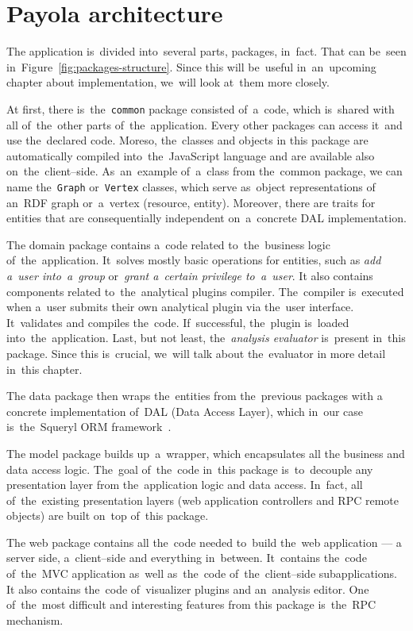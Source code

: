 \section{Payola architecture}
The application is~divided into~several parts, packages, in~fact. That can be~seen in~Figure~\ref{fig:packages-structure}. Since this will be~useful in~an~upcoming
chapter about implementation, we~will look at~them more closely.

At first, there is~the~\texttt{common} package consisted of~a~code, which is~shared with all of~the~other parts of~the~application. Every other packages can 
access it~and use the~declared code. Moreso, the~classes and objects 
in this package are automatically compiled into~the~JavaScript language and are available
also on~the~client--side. As~an~example of~a~class from the~common package, we
can name the~\texttt{Graph} or~\texttt{Vertex} classes, which serve as~object representations
of an~RDF graph or~a~vertex (resource, entity). Moreover, there are traits for 
entities that are consequentially independent on~a~concrete DAL implementation.

The domain package contains a~code related to~the~business logic of~the~application. It~solves mostly basic operations for entities, such as
\emph{add a~user into~a~group} or~\emph{grant a~certain privilege to~a~user}.
It also contains components related to~the~analytical plugins compiler. The~compiler is~executed when a~user submits their own analytical plugin via the~user 
interface. It~validates and compiles the~code. If~successful, the~plugin is~loaded into~the~application. Last, but not least, the~\emph{analysis evaluator} is~present in~this package. Since this is~crucial, we~will talk about the~evaluator
in more detail in~this chapter.

The data package then wraps the~entities from the~previous packages with a
concrete implementation of~DAL (Data Access Layer), which in~our case is~the~Squeryl
ORM framework~\cite{squeryl}.

The model package builds up~a~wrapper, which encapsulates all the
business and data access logic. The~goal of~the~code in~this package is~to~decouple
any presentation layer from the~application logic and data access. In~fact,
all of~the~existing presentation layers (web application controllers and
RPC remote objects) are built on~top of~this package. 

The web package contains all the~code needed to~build the~web application --- 
a server side, a~client--side and everything in~between. It~contains the~code of~the~MVC application as~well as~the~code of~the~client--side subapplications.
It also contains the~code of~visualizer plugins and an~analysis editor. One of~the~most difficult and interesting features from this package is~the~RPC mechanism.

